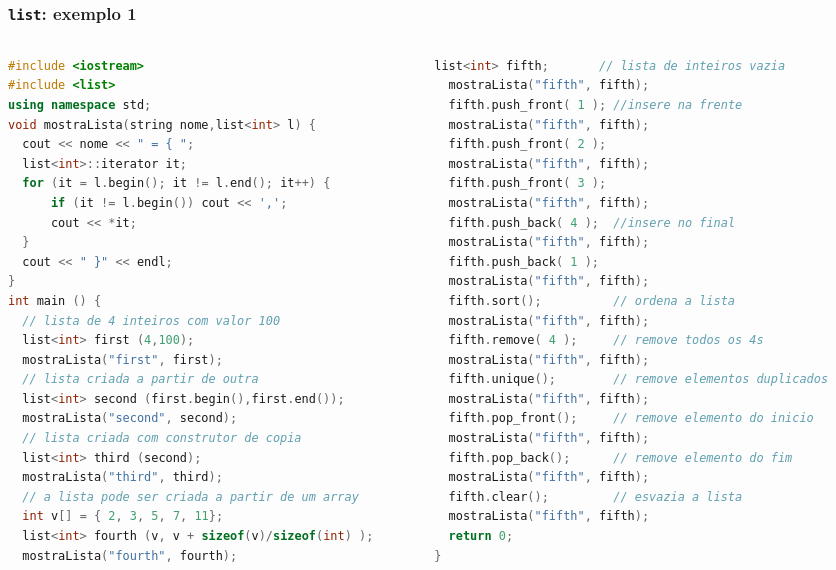 \documentclass[xcolor={dvipsnames,table},aspectratio=169]{beamer}
\begin{document}
\begin{frame}[fragile]\frametitle{\texttt{list}: exemplo 1}
\begin{columns}
\begin{column}{0.5\linewidth}
\begin{lstlisting}[language=C++,basicstyle=\ttfamily\tiny]
#include <iostream>
#include <list>
using namespace std;
void mostraLista(string nome,list<int> l) {
  cout << nome << " = { ";
  list<int>::iterator it;
  for (it = l.begin(); it != l.end(); it++) {
      if (it != l.begin()) cout << ',';
      cout << *it;
  }
  cout << " }" << endl;
}
int main () {
  // lista de 4 inteiros com valor 100
  list<int> first (4,100);
  mostraLista("first", first);
  // lista criada a partir de outra
  list<int> second (first.begin(),first.end());
  mostraLista("second", second);
  // lista criada com construtor de copia
  list<int> third (second);
  mostraLista("third", third);
  // a lista pode ser criada a partir de um array
  int v[] = { 2, 3, 5, 7, 11};
  list<int> fourth (v, v + sizeof(v)/sizeof(int) );
  mostraLista("fourth", fourth);
\end{lstlisting}
\end{column}
\begin{column}{0.5\linewidth}
\begin{lstlisting}[language=C++,basicstyle=\ttfamily\tiny]
  list<int> fifth;       // lista de inteiros vazia
  mostraLista("fifth", fifth);
  fifth.push_front( 1 ); //insere na frente
  mostraLista("fifth", fifth);
  fifth.push_front( 2 );
  mostraLista("fifth", fifth);
  fifth.push_front( 3 );
  mostraLista("fifth", fifth);
  fifth.push_back( 4 );  //insere no final
  mostraLista("fifth", fifth);
  fifth.push_back( 1 );
  mostraLista("fifth", fifth);
  fifth.sort();          // ordena a lista
  mostraLista("fifth", fifth);
  fifth.remove( 4 );     // remove todos os 4s
  mostraLista("fifth", fifth);
  fifth.unique();        // remove elementos duplicados
  mostraLista("fifth", fifth);
  fifth.pop_front();     // remove elemento do inicio
  mostraLista("fifth", fifth);
  fifth.pop_back();      // remove elemento do fim
  mostraLista("fifth", fifth);
  fifth.clear();         // esvazia a lista
  mostraLista("fifth", fifth);
  return 0;
}
\end{lstlisting}
\end{column}
\end{columns}
\end{frame}
\end{document}
